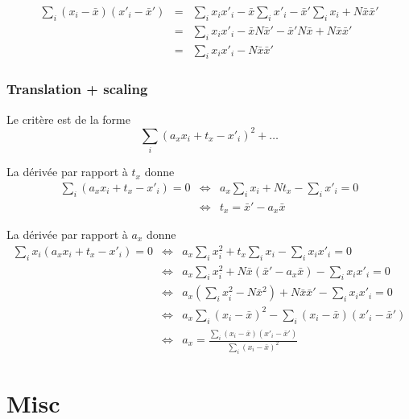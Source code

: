 \documentclass[10pt]{report}
\begin{document}
\begin{eqnarray*}
\sum_i \left( x_i - \bar{x} \right) \left( x'_i - \bar{x}' \right) 
& = &
\sum_i x_i x'_i - \bar{x} \sum_i x'_i - \bar{x}' \sum_i x_i + N \bar{x} \bar{x}' \\
& = &
\sum_i x_i x'_i - \bar{x} N \bar{x}' - \bar{x}' N \bar{x} + N \bar{x} \bar{x}' \\
& = &
\sum_i x_i x'_i - N \bar{x} \bar{x}'
\end{eqnarray*}

\subsection{Translation + scaling}

Le crit\`ere est de la forme
$$
\sum_i \left( a_x x_i + t_x - x'_i \right)^2 + \ldots
$$

La d\'eriv\'ee par rapport \`a $t_x$ donne
\begin{eqnarray*}
\sum_i \left( a_x x_i + t_x - x'_i \right) = 0
& \Longleftrightarrow &
a_x \sum_i x_i + N t_x - \sum_i x'_i = 0 \\
& \Longleftrightarrow &
t_x = \bar{x}' - a_x \bar{x} 
\end{eqnarray*}

La d\'eriv\'ee par rapport \`a $a_x$ donne
\begin{eqnarray*}
\sum_i x_i \left( a_x x_i + t_x - x'_i \right) = 0
& \Longleftrightarrow &
a_x \sum_i x_i^2 + t_x \sum_i x_i - \sum_i x_i x'_i = 0\\
& \Longleftrightarrow &
a_x \sum_i x_i^2 +
N \bar{x} \left( \bar{x}' - a_x \bar{x} \right) - \sum_i x_i x'_i = 0\\
& \Longleftrightarrow &
a_x \left( \sum_i x_i^2 - N \bar{x}^2 \right)
+ N \bar{x} \bar{x}' - \sum_i x_i x'_i = 0 \\
& \Longleftrightarrow &
a_x \sum_i \left( x_i - \bar{x} \right)^2  
 - \sum_i \left( x_i - \bar{x} \right)\left( x'_i - \bar{x}' \right) \\
& \Longleftrightarrow &
a_x = \frac{\sum_i \left( x_i - \bar{x} \right)\left( x'_i - \bar{x}' \right)}{\sum_i \left( x_i - \bar{x} \right)^2}
\end{eqnarray*}













\newpage
\chapter{Misc}
\end{document}
